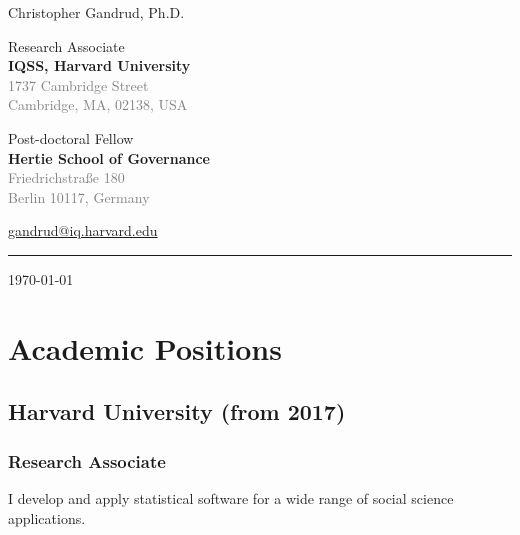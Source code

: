 \documentclass[a4paper]{article}
\begin{document}
    \begin{flushright}
        {\huge{Christopher Gandrud, Ph.D.}} \\
        \vspace{0.25cm}

        Research Associate \\
        {\bf{\large{IQSS, Harvard University}}} \\
        \textcolor{gray}{1737 Cambridge Street \\
        Cambridge, MA, 02138, USA}

        \vspace{0.5cm}

        Post-doctoral Fellow \\
        {\bf{\large{Hertie School of Governance}}} \\
        \textcolor{gray}{Friedrichstra{\ss}e 180\\
        Berlin 10117, Germany} \\
        \vspace{0.25cm}

        \href{mailto:gandrud@iq.harvard.edu}{gandrud@iq.harvard.edu}\\[0.25cm]

        \medskip\hrule height 1pt

        \vspace{0.5cm}

        \today

    \end{flushright}



\vspace{0.5cm}

\section*{Academic Positions}

\subsection*{Harvard University (from 2017)}

\subsubsection*{Research Associate}

I develop and apply statistical software for a wide range of social science applications.
\end{document}
